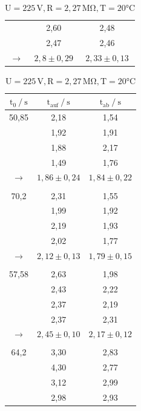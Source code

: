 \begin{table} [H]
\begin{subtable}[c]{0.5\textwidth}
\begin{tabular}{ c | c | c}
            & 2,60 & 2,48 \\
            & 2,47 & 2,46 \\
            \rowcolor{gray}$\to$ & $ 2,8 \pm 0,29 $ & $ 2,33 \pm 0,13 $ \\
        \bottomrule
        \end{tabular}
        \end{subtable}
    \begin{subtable}[c]{0.5\textwidth}
        \centering
        \caption{$\text{U} = 225\,\text{V}, \text{R} = 2,27\,\unit{\mega\ohm}, \text{T} = 20\unit{\celsius}  $}
        \begin{tabular}{ c|c|c}
            \toprule
            {$\text{t}_{0} \mathbin{/}\unit{\second} $}&
            {$\text{t}_{\text{auf}} \mathbin{/}\unit{\second} $}&
            {$\text{t}_{\text{ab}} \mathbin{/}\unit{\second} $}\\
            \midrule
            50,85  & 2,18 & 1,54 \\
                & 1,92 & 1,91 \\
                & 1,88 & 2,17 \\
                & 1,49 & 1,76 \\
            \rowcolor{gray}$\to$ & $1,86 \pm 0,24$ & $1,84 \pm 0,22$ \\
                &  &  \\
            70,2 & 2,31 & 1,55\\
                & 1,99 & 1,92 \\
                & 2,19 & 1,93 \\
                & 2,02 & 1,77 \\
            \rowcolor{gray}$\to$ & $2,12 \pm 0,13$ & $1,79 \pm 0,15$ \\
                &  &  \\
            57,58 & 2,63 & 1,98 \\
                & 2,43 & 2,22 \\
                & 2,37 & 2,19 \\
                & 2,37 & 2,31 \\
            \rowcolor{gray}$\to$ & $2,45 \pm 0,10$ & $2,17 \pm 0,12$ \\
                &  &  \\
            64,2 & 3,30 & 2,83 \\
                & 4,30 & 2,77 \\
                & 3,12 & 2,99 \\
                & 2,98 & 2,93 \\

\end{tabular}
\end{subtable}
\end{table}
